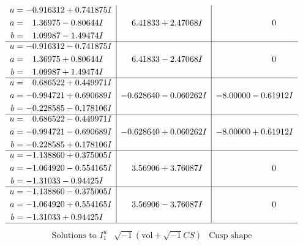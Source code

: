 \documentclass[1p]{elsarticle_modified}
\theoremstyle{definition}
\newcommand{\I}{\sqrt{-1}}
\begin{document}
$$\begin{array}{c|c|c}
\begin{aligned}
u &= -0.916312 + 0.741875 I \\
a &= \phantom{-}1.36975 - 0.80644 I \\
b &= \phantom{-}1.09987 - 1.49474 I\end{aligned}
 & \phantom{-}6.41833 + 2.47068 I & \phantom{-0.000000 } 0 \\ \hline\begin{aligned}
u &= -0.916312 - 0.741875 I \\
a &= \phantom{-}1.36975 + 0.80644 I \\
b &= \phantom{-}1.09987 + 1.49474 I\end{aligned}
 & \phantom{-}6.41833 - 2.47068 I & \phantom{-0.000000 } 0 \\ \hline\begin{aligned}
u &= \phantom{-}0.686522 + 0.449971 I \\
a &= -0.994721 + 0.690689 I \\
b &= -0.228585 - 0.178106 I\end{aligned}
 & -0.628640 - 0.060262 I & -8.00000 - 0.61912 I \\ \hline\begin{aligned}
u &= \phantom{-}0.686522 - 0.449971 I \\
a &= -0.994721 - 0.690689 I \\
b &= -0.228585 + 0.178106 I\end{aligned}
 & -0.628640 + 0.060262 I & -8.00000 + 0.61912 I \\ \hline\begin{aligned}
u &= -1.138860 + 0.375005 I \\
a &= -1.064920 - 0.554165 I \\
b &= -1.31033 - 0.94425 I\end{aligned}
 & \phantom{-}3.56906 + 3.76087 I & \phantom{-0.000000 } 0 \\ \hline\begin{aligned}
u &= -1.138860 - 0.375005 I \\
a &= -1.064920 + 0.554165 I \\
b &= -1.31033 + 0.94425 I\end{aligned}
 & \phantom{-}3.56906 - 3.76087 I & \phantom{-0.000000 } 0\\
 \hline 
 \end{array}$$\newpage$$\begin{array}{c|c|c}  
\text{Solutions to }I^u_{1}& \I (\text{vol} + \sqrt{-1}CS) & \text{Cusp shape}\\
 \hline 
\begin{aligned}

\end{aligned}
\end{array}$$
\end{document}

